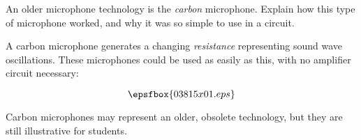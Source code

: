 

An older microphone technology is the {\it carbon} microphone.  Explain how this type of microphone worked, and why it was so simple to use in a circuit.







A carbon microphone generates a changing {\it resistance} representing sound wave oscillations.  These microphones could be used as easily as this, with no amplifier circuit necessary:

$$\epsfbox{03815x01.eps}$$







Carbon microphones may represent an older, obsolete technology, but they are still illustrative for students.




